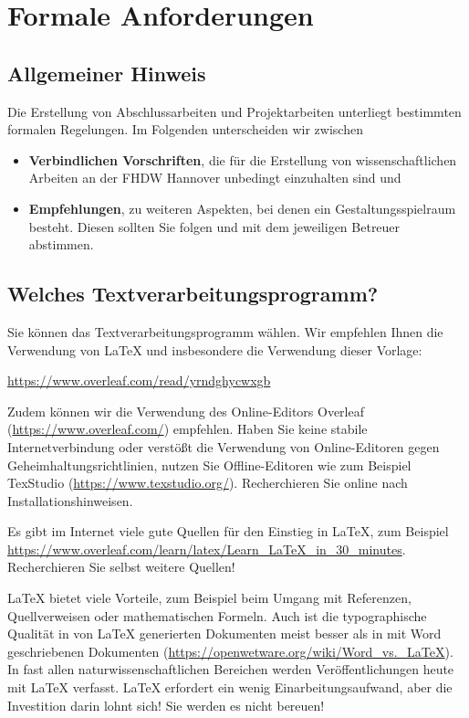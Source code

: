 \chapter{Formale Anforderungen}
\label{chap:anforderungen}

\section{Allgemeiner Hinweis}

Die Erstellung von Abschlussarbeiten und Projektarbeiten unterliegt bestimmten formalen Regelungen. 
Im Folgenden unterscheiden wir zwischen

\begin{itemize}
    \item \textbf{Verbindlichen Vorschriften}, die für die Erstellung von wissenschaftlichen Arbeiten an der FHDW Hannover unbedingt einzuhalten sind und
    \item \textbf{Empfehlungen}, zu weiteren Aspekten, bei denen ein Gestaltungsspielraum besteht. Diesen sollten Sie folgen und mit dem jeweiligen Betreuer abstimmen.
\end{itemize}

\section{Welches Textverarbeitungsprogramm?}

Sie können das Textverarbeitungsprogramm wählen. Wir empfehlen Ihnen die Verwendung von \LaTeX{} und insbesondere die Verwendung dieser Vorlage:

\begin{center}
 \url{https://www.overleaf.com/read/yrndghycwxgb}   
\end{center}

Zudem können wir die Verwendung des Online-Editors Overleaf (\url{https://www.overleaf.com/}) empfehlen. Haben Sie keine stabile Internetverbindung oder verstößt die Verwendung von Online-Editoren gegen Geheimhaltungsrichtlinien, nutzen Sie Offline-Editoren wie zum Beispiel TexStudio (\url{https://www.texstudio.org/}). Recherchieren Sie online nach Installationshinweisen.

Es gibt im Internet viele gute Quellen für den Einstieg in \LaTeX{}, zum Beispiel \url{https://www.overleaf.com/learn/latex/Learn_LaTeX_in_30_minutes}. Recherchieren Sie selbst weitere Quellen!

\LaTeX{} bietet viele Vorteile, zum Beispiel beim Umgang mit Referenzen, Quellverweisen oder mathematischen Formeln. Auch ist die typographische Qualität in von \LaTeX{} generierten Dokumenten meist besser als in mit Word geschriebenen Dokumenten (\url{https://openwetware.org/wiki/Word_vs._LaTeX}). In fast allen naturwissenschaftlichen Bereichen werden Veröffentlichungen heute mit \LaTeX{} verfasst. \LaTeX{} erfordert ein wenig Einarbeitungsaufwand, aber die Investition darin lohnt sich! Sie werden es nicht bereuen!

